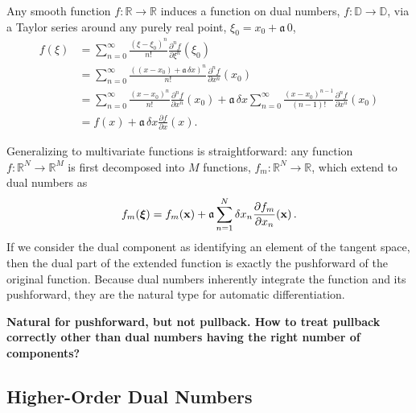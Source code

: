 Any smooth function $f : \mathbb{R} \rightarrow \mathbb{R}$ induces a function on 
dual numbers, $f : \mathbb{D} \rightarrow \mathbb{D}$, via a Taylor series around any 
purely real point, $\xi_{0} = x_{0} + \mathfrak{a} \, 0$,
%
\begin{align*}
f \! \left( \xi \right) 
&= 
\sum_{n = 0}^{\infty} \frac{ \left( \xi - \xi_{0} \right)^{n} }{n!} 
\frac{ \partial^{n} f }{ \partial \xi^{n} } \! \left( \xi_{0} \right) 
\\
&= 
\sum_{n = 0}^{\infty} \frac{ \left( \left( x - x_{0} \right) + \mathfrak{a} \, \delta x \right)^{n} }{n!} 
\frac{ \partial^{n} f }{ \partial x^{n} } \! \left( x_{0} \right)
\\
&= 
\sum_{n = 0}^{\infty} \frac{ \left( x - x_{0} \right)^{n} }{n!} 
\frac{ \partial^{n} f }{ \partial x^{n} } \! \left( x_{0} \right)
+ \mathfrak{a} \, \delta x \sum_{n = 0}^{\infty} \frac{ \left( x - x_{0} \right)^{n - 1} }{\left( n - 1 \right)!} 
\frac{ \partial^{n} f }{ \partial x^{n} } \! \left( x_{0} \right) 
\\
&= 
f \! \left( x \right) 
+ \mathfrak{a} \, \delta x \frac{ \partial f }{ \partial x } \! \left( x \right).
\end{align*}

Generalizing to multivariate functions is straightforward: any function 
$f : \mathbb{R}^{N} \rightarrow \mathbb{R}^{M}$ is first decomposed into $M$
functions, $f_{m} : \mathbb{R}^{N} \rightarrow \mathbb{R}$, which extend
to dual numbers as
%
\begin{equation} \label{dual_function}
f_{m} \! \left( \mbox{\boldmath{$\xi$}} \right) = f_{m} \! \left( \mathbf{x} \right) 
+ \mathfrak{a} \sum_{n = 1}^{N} 
\delta x_{n} \frac{ \partial f_{m} }{ \partial x_{n} } \! \left( \mathbf{x} \right).
\end{equation}
%
If we consider the dual component as identifying an element of the tangent
space, then the dual part of the extended function is exactly the pushforward 
of the original function.  Because dual numbers inherently integrate the function 
and its pushforward, they are the natural type for automatic differentiation.

\textbf{Natural for pushforward, but not pullback.  How to treat pullback correctly
other than dual numbers having the right number of components?}

\subsection{Higher-Order Dual Numbers}

